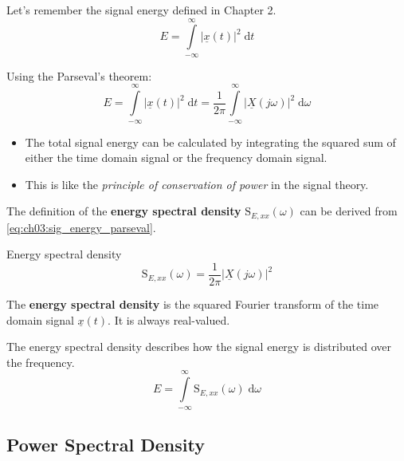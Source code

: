\begin{refsection}
Let's remember the signal energy defined in Chapter 2.
\begin{equation}
	E = \int\limits_{-\infty}^{\infty} \left|\underline{x}(t)\right|^2 \; \mathrm{d} t
\end{equation}

Using the Parseval's theorem:
\begin{equation}
	E = \int\limits_{-\infty}^{\infty} \left|\underline{x}(t)\right|^2 \; \mathrm{d} t = \frac{1}{2 \pi} \int\limits_{-\infty}^{\infty} \left|\underline{X}\left(j \omega\right)\right|^2 \; \mathrm{d} \omega
	\label{eq:ch03:sig_energy_parseval}
\end{equation}

\begin{itemize}
	\item The total signal energy can be calculated by integrating the squared sum of either the time domain signal or the frequency domain signal.
	\item This is like the \emph{principle of conservation of power} in the signal theory.
\end{itemize}

The definition of the \textbf{energy spectral density} $\mathrm{S}_{E,xx}(\omega)$ can be derived from \eqref{eq:ch03:sig_energy_parseval}.

\begin{definition}{Energy spectral density}
	\begin{equation}
		\mathrm{S}_{E,xx}(\omega) = \frac{1}{2 \pi} \left|\underline{X}\left(j \omega\right)\right|^2
	\end{equation}%
	
	The  \textbf{energy spectral density} is the squared Fourier transform of the time domain signal $\underline{x}(t)$. It is always real-valued.
\end{definition}

The energy spectral density describes how the signal energy is distributed over the frequency.
\begin{equation}
	E = \int\limits_{-\infty}^{\infty} \mathrm{S}_{E,xx}(\omega) \; \mathrm{d} \omega
\end{equation}

\subsection{Power Spectral Density}


\end{refsection}
